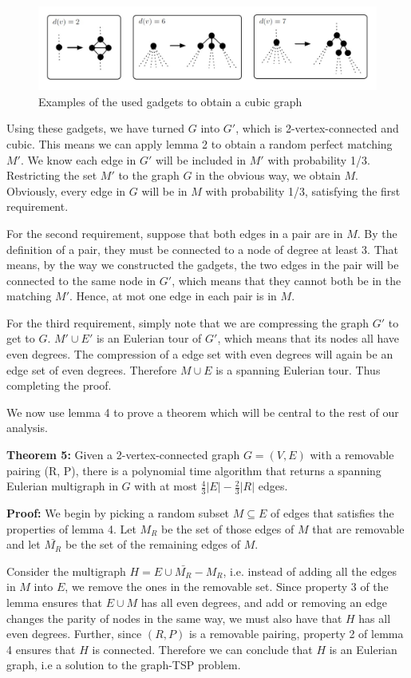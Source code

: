 \documentclass[12pt]{article}
\begin{document}
\begin{figure}[t]
\includegraphics[width=14cm]{gadget.jpg}
\caption{Examples of the used gadgets to obtain a cubic graph}
\end{figure}

Using these gadgets, we have turned $G$ into $G'$, which is 2-vertex-connected and cubic. This means we can apply lemma 2 to obtain a random perfect matching $M'$. We know each edge in $G'$ will be included in $M'$ with probability 1/3. Restricting the set $M'$ to the graph $G$ in the obvious way, we obtain $M$. Obviously, every edge in $G$ will be in $M$ with probability 1/3, satisfying the first requirement.

For the second requirement, suppose that both edges in a pair are in $M$. By the definition of a pair, they must be connected to a node of degree at least 3. That means, by the way we constructed the gadgets, the two edges in the pair will be connected to the same node in $G'$, which means that they cannot both be in the matching $M'$. Hence, at mot one edge in each pair is in $M$.

For the third requirement, simply note that we are compressing the graph $G'$ to get to $G$. $M'\cup E'$ is an Eulerian tour of $G'$, which means that its nodes all have even degrees. The compression of a edge set with even degrees will again be an edge set of even degrees. Therefore $M\cup E$ is a spanning Eulerian tour. Thus completing the proof.

We now use lemma 4 to prove a theorem which will be central to the rest of our analysis.

{\bf Theorem 5:} Given a 2-vertex-connected graph $G = (V,E)$ with a removable pairing (R, P), there is a polynomial time algorithm that returns a spanning Eulerian multigraph in $G$ with at most $\frac{4}{3}|E| - \frac{2}{3}|R|$ edges.

{\bf Proof:}
We begin by picking a random subset $M \subseteq E$ of edges that satisfies the properties of lemma 4. Let $M_R$ be the set of those edges of $M$ that are removable and let $\bar{M_R}$ be the set of the remaining edges of $M$.

Consider the multigraph $H = E\cup \bar{M_R} - M_R$, i.e. instead of adding all the edges in $M$ into $E$, we remove the ones in the removable set. Since property 3 of the lemma ensures that $E\cup M$ has all even degrees, and add or removing an edge changes the parity of nodes in the same way, we must also have that $H$ has all even degrees. Further, since $(R,P)$ is a removable pairing, property 2 of lemma 4 ensures that $H$ is connected. Therefore we can conclude that $H$ is an Eulerian graph, i.e a solution to the graph-TSP problem.
\end{document}
